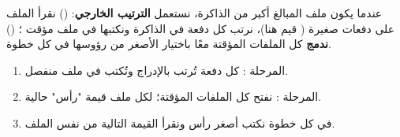 \clearpage
{}

\begin{statement}
عندما يكون ملف المبالغ أكبر من الذاكرة، نستعمل \textbf{الترتيب الخارجي}: () نقرأ الملف على دفعات صغيرة ( قيم هنا)، نرتب كل دفعة في الذاكرة ونكتبها في ملف مؤقت ؛ () \textbf{ندمج} كل الملفات المؤقتة معًا باختيار الأصغر من رؤوسها في كل خطوة.
\end{statement}
\begin{stepsbox}\begin{enumerate}
\item المرحلة : كل دفعة تُرتب بالإدراج وتُكتب في ملف منفصل.
\item المرحلة : نفتح كل الملفات المؤقتة؛ لكل ملف قيمة "رأس" حالية.
\item في كل خطوة نكتب أصغر رأس ونقرأ القيمة التالية من نفس الملف.
\end{enumerate}\end{stepsbox}
